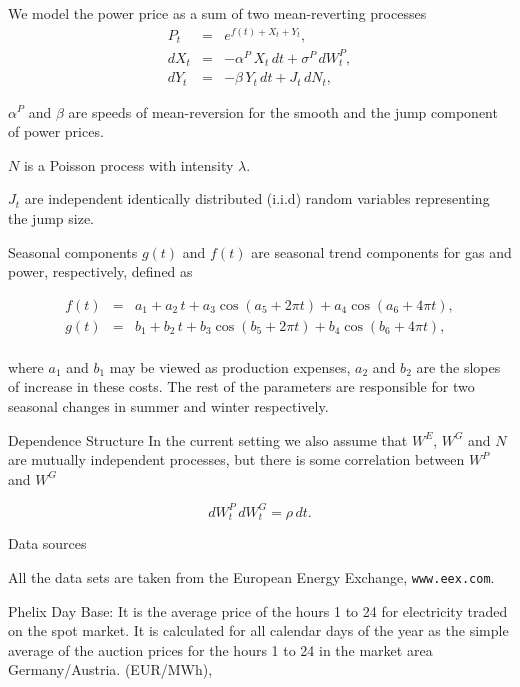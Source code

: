 	We model the power price as a sum of two mean-reverting processes
\begin{eqnarray}
P_t & = & e^{f(t) + X_t + Y_t},  \nonumber \\
d{X}_t & = & -\alpha^P\,X_t\,d{t} + \sigma^P\,d{W}^P_t, \nonumber \\
d{Y}_t & = & -\beta\,Y_t\,d{t} + J_t\,d{N}_t,
\label{power}
\end{eqnarray}


	$\alpha^P$ and $\beta$ are speeds of mean-reversion for the smooth and the jump component of power prices.


	$N$ is a Poisson process with intensity $\lambda$.


	$J_t$ are independent identically distributed (i.i.d) random variables representing the jump size.





{Seasonal components}
$g(t)$ and $f(t)$ are seasonal trend components for gas and power, respectively, defined as

\begin{eqnarray}
f(t) &=& a_1 + a_2\,t + a_3\cos(a_5 + 2\pi t) + a_4\cos(a_6 + 4\pi t), \nonumber \\
g(t) &=& b_1 + b_2\,t + b_3\cos(b_5 + 2\pi t) + b_4\cos(b_6 + 4\pi t), \nonumber \\
\label{grseasonality}
\end{eqnarray}

where $a_1$ and $b_1$ may be viewed as production expenses, $a_2$ and $b_2$ are the slopes of increase in these costs. The rest of the parameters are responsible for two seasonal changes in summer and winter respectively.

{Dependence Structure}
In the current setting we also assume that $W^E$, $W^G$ and $N$ are mutually independent processes, but there is some correlation between  $W^P$ and $W^G$

\begin{equation}
d{W}^P_t\,d{W}^G_t = \rho\,d{t}.
\label{corr}
\end{equation}

{Data sources}




%

	All the data sets are taken from the European Energy Exchange, \texttt{www.eex.com}.


	Phelix Day Base: It is the average price of the hours 1 to 24 for electricity traded on the spot market.
It is calculated for all calendar days of the year as the simple average of the auction prices for the
hours 1 to 24 in the market area Germany/Austria. (EUR/MWh),


